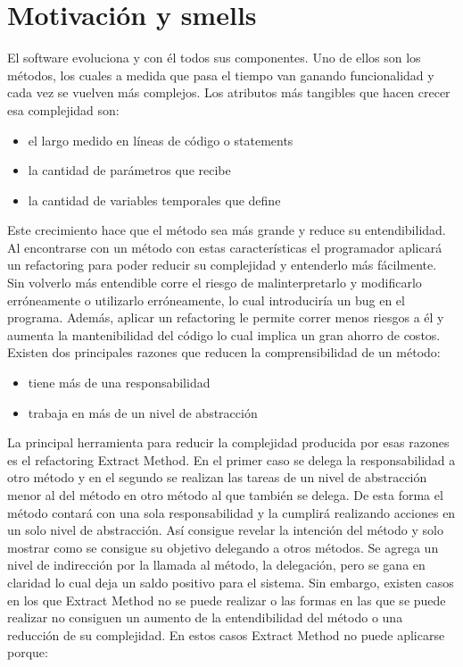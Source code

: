 \section{Motivación y smells}
El software evoluciona y con él todos sus componentes. Uno de ellos son los métodos, los cuales a
medida que pasa el tiempo van ganando funcionalidad y cada vez se vuelven más complejos. Los
atributos más tangibles que hacen crecer esa complejidad son:

\begin{itemize}
    \item el largo medido en líneas de código o statements
    \item la cantidad de parámetros que recibe
    \item la cantidad de variables temporales que define
\end{itemize}

Este crecimiento hace que el método sea más grande y reduce su entendibilidad. Al encontrarse con un
método con estas características el programador aplicará un refactoring para poder reducir su
complejidad y entenderlo más fácilmente. Sin volverlo más entendible corre el riesgo de
malinterpretarlo y modificarlo erróneamente o utilizarlo erróneamente, lo cual introduciría un bug
en el programa. Además, aplicar un refactoring le permite correr menos riesgos a él y aumenta la
mantenibilidad del código lo cual implica un gran ahorro de costos.
Existen dos principales razones que reducen la comprensibilidad de un método:

\begin{itemize}
    \item tiene más de una responsabilidad
    \item trabaja en más de un nivel de abstracción
\end{itemize}

La principal herramienta para reducir la complejidad producida por esas razones es el refactoring
Extract Method. En el primer caso se delega la responsabilidad a otro método y en el segundo se
realizan las tareas de un nivel de abstracción menor al del método en otro método al que también se
delega. De esta forma el método contará con una sola responsabilidad y la cumplirá realizando
acciones en un solo nivel de abstracción. Así consigue revelar la intención del método y solo
mostrar como se consigue su objetivo delegando a otros métodos. Se agrega un nivel de indirección
por la llamada al método, la delegación, pero se gana en claridad lo cual deja un saldo positivo
para el sistema. Sin embargo, existen casos en los que Extract Method no se puede realizar o las
formas en las que se puede realizar no consiguen un aumento de la entendibilidad del método o una
reducción de su complejidad. En estos casos Extract Method no puede aplicarse porque:

